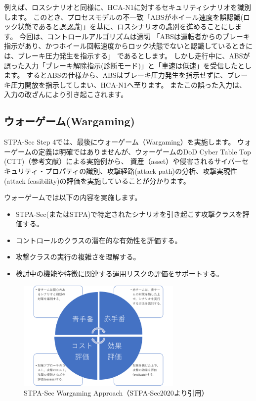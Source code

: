 例えば、ロスシナリオと同様に、HCA-N1に対するセキュリティシナリオを識別します。
このとき、プロセスモデルの不一致「ABSがホイール速度を誤認識(ロック状態であると誤認識)」を基に、ロスシナリオの識別を進めることにします。
今回は、コントロールアルゴリズムは適切
「ABSは運転者からのブレーキ指示があり、かつホイール回転速度からロック状態でないと認識しているときには、ブレーキ圧力発生を指示する」
であるとします。
しかし走行中に、ABSが誤った入力「ブレーキ解除指示(診断モード)」と「車速は低速」を受信したとします。
するとABSの仕様から、ABSはブレーキ圧力発生を指示せずに、ブレーキ圧力開放を指示してしまい、HCA-N1へ至ります。
またこの誤った入力は、入力の改ざんにより引き起こされます。

\subsection{ウォーゲーム(Wargaming)}

STPA-Sec Step 4では、最後にウォーゲーム（Wargaming）を実施します。
ウォーゲームの定義は明確ではありませんが、ウォーゲームのDoD Cyber Table Top (CTT)（参考文献）による実施例から、
資産（asset）や侵害されるサイバーセキュリティ・プロパティの識別、攻撃経路(attack path)の分析、攻撃実現性(attack feasibility)の評価を実施していることが分かります。

ウォーゲームでは以下の内容を実施します。
%
\begin{itemize}
    \item STPA-Sec(またはSTPA)で特定されたシナリオを引き起こす攻撃クラスを評価する。
    \item コントロールのクラスの潜在的な有効性を評価する。
    \item 攻撃クラスの実行の複雑さを理解する。
    \item 検討中の機能や特徴に関連する運用リスクの評価をサポートする。
\end{itemize}
%
\begin{figure}[H]
    \centering
    \includegraphics[width=80mm]{safety_assurance_contents/ch3images/fig-3-3-1-04.png}
    \caption{STPA-Sec Wargaming Approach（STPA-Sec2020より引用）}
\end{figure}

